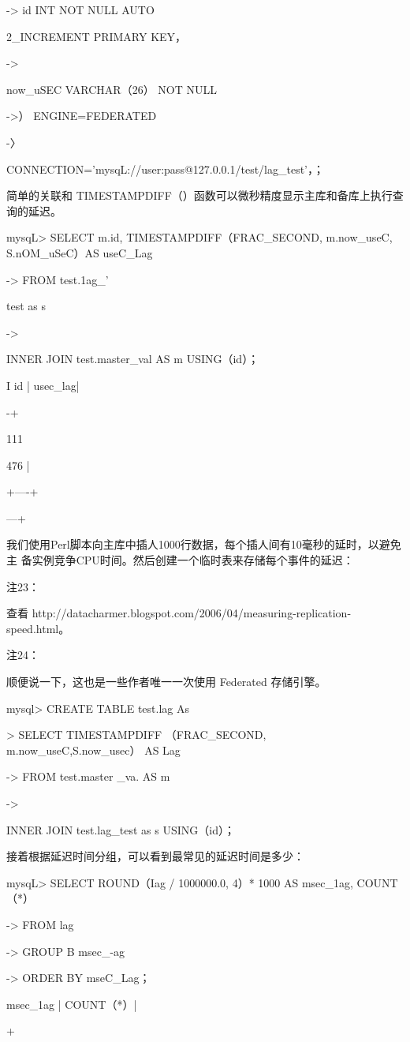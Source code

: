 -> id INT NOT NULL AUTO

2\_INCREMENT PRIMARY KEY，

->

now\_uSEC VARCHAR（26） NOT NULL

->） ENGINE=FEDERATED

-〉

CONNECTION='mysqL://user:pass@127.0.0.1/test/lag\_test'，；

简单的关联和 TIMESTAMPDIFF（）函数可以微秒精度显示主库和备库上执行查询的延迟。

mysqL> SELECT m.id, TIMESTAMPDIFF（FRAC\_SECOND, m.now\_useC, S.nOM\_uSeC）AS useC\_Lag

-> FROM test.1ag\_'

test as s

->

INNER JOIN test.master\_val AS m USING（id）；

I id | usec\_lag|

-+

111

476 |

+----+

---+

我们使用Perl脚本向主库中插人1000行数据，每个插人间有10毫秒的延时，以避免主
备实例竞争CPU时间。然后创建一个临时表来存储每个事件的延迟：

注23：

查看 http://datacharmer.blogspot.com/2006/04/measuring-replication-speed.html。

注24：

顺便说一下，这也是一些作者唯一一次使用 Federated 存储引擎。

mysql> CREATE TABLE test.lag As

> SELECT TIMESTAMPDIFF （FRAC\_SECOND, m.now\_useC,S.now\_usec） AS Lag

-> FROM test.master \_va. AS m

->

INNER JOIN test.lag\_test as s USING（id）；

接着根据延迟时间分组，可以看到最常见的延迟时间是多少：

mysqL> SELECT ROUND（Iag / 1000000.0, 4）* 1000 AS msec\_1ag, COUNT（*）

-> FROM lag

-> GROUP B msec\_-ag

-> ORDER BY mseC\_Lag；

msec\_1ag | COUNT（*）|

+

